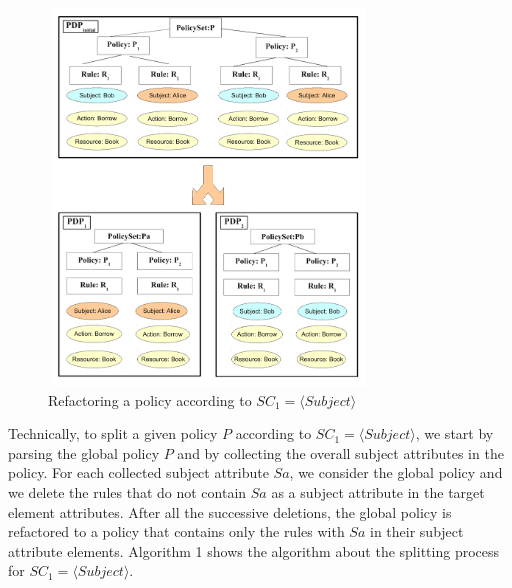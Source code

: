 \begin{figure}[!h]
\begin{center}
\includegraphics[width=8.5cm, height=10cm]{splitting}
\caption{Refactoring a policy according to $SC_{1}=\langle Subject\rangle$}
\label{splitting}
\end{center}
\end{figure}

Technically, to split a given policy $P$ according to $SC_{1}=\langle Subject\rangle$, we start by parsing the global policy $P$ 
and by collecting the overall subject attributes in the policy. For each collected subject attribute $Sa$, we consider the global policy and we 
delete the rules that do not contain $Sa$ as a subject attribute in the target element attributes. After all the successive deletions, the global 
policy is refactored to a policy that contains only the rules with $Sa$ in their subject attribute elements. 
Algorithm 1 shows the algorithm about the splitting process for $SC_{1}=\langle Subject\rangle$.

